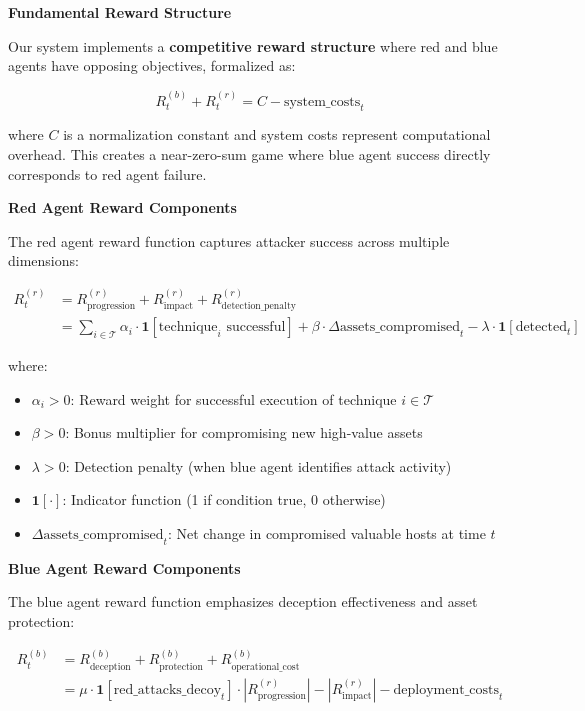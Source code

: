 \documentclass[12pt]{article}
\theoremstyle{definition}
\theoremstyle{plain}
\begin{document}
\textbf{Fundamental Reward Structure}

Our system implements a \textbf{competitive reward structure} where red and blue agents have opposing objectives, formalized as:

\begin{equation}
R^{(b)}_t + R^{(r)}_t = C - \text{system\_costs}_t
\end{equation}

where $C$ is a normalization constant and system costs represent computational overhead. This creates a near-zero-sum game where blue agent success directly corresponds to red agent failure.

\textbf{Red Agent Reward Components}

The red agent reward function captures attacker success across multiple dimensions:

\begin{align}
R^{(r)}_t &= R^{(r)}_{\text{progression}} + R^{(r)}_{\text{impact}} + R^{(r)}_{\text{detection\_penalty}} \\
&= \sum_{i \in \mathcal{T}} \alpha_i \cdot \mathbf{1}[\text{technique}_i \text{ successful}] + \beta \cdot \Delta\text{assets\_compromised}_t - \lambda \cdot \mathbf{1}[\text{detected}_t]
\end{align}

where:
\begin{itemize}
    \item $\alpha_i > 0$: Reward weight for successful execution of technique $i \in \mathcal{T}$
    \item $\beta > 0$: Bonus multiplier for compromising new high-value assets
    \item $\lambda > 0$: Detection penalty (when blue agent identifies attack activity)
    \item $\mathbf{1}[\cdot]$: Indicator function (1 if condition true, 0 otherwise)
    \item $\Delta\text{assets\_compromised}_t$: Net change in compromised valuable hosts at time $t$
\end{itemize}

\textbf{Blue Agent Reward Components}

The blue agent reward function emphasizes deception effectiveness and asset protection:

\begin{align}
R^{(b)}_t &= R^{(b)}_{\text{deception}} + R^{(b)}_{\text{protection}} + R^{(b)}_{\text{operational\_cost}} \\
&= \mu \cdot \mathbf{1}[\text{red\_attacks\_decoy}_t] \cdot |R^{(r)}_{\text{progression}}| - |R^{(r)}_{\text{impact}}| - \text{deployment\_costs}_t
\end{align}
\end{document}
